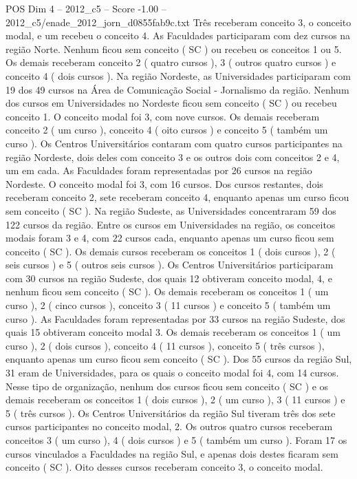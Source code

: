 \begin{textsample}{POS Dim 4 – 2012\_c5 – Score -1.00 – 2012\_c5/enade\_2012\_jorn\_d0855fab9c.txt}
Três receberam conceito 3, o conceito modal, e um recebeu o conceito 4.
As Faculdades participaram com dez cursos na região Norte.
Nenhum ficou sem conceito ( SC ) ou recebeu os conceitos 1 ou 5.
Os demais receberam conceito 2 ( quatro cursos ), 3 ( outros quatro cursos ) e conceito 4 ( dois cursos ).
Na região Nordeste, as Universidades participaram com 19 dos 49 cursos na Área de Comunicação Social - Jornalismo da região.
Nenhum dos cursos em Universidades no Nordeste ficou sem conceito ( SC ) ou recebeu conceito 1.
O conceito modal foi 3, com nove cursos.
Os demais receberam conceito 2 ( um curso ), conceito 4 ( oito cursos ) e conceito 5 ( também um curso ).
Os Centros Universitários contaram com quatro cursos participantes na região Nordeste, dois deles com conceito 3 e os outros dois com conceitos 2 e 4, um em cada.
As Faculdades foram representadas por 26 cursos na região Nordeste.
O conceito modal foi 3, com 16 cursos.
Dos cursos restantes, dois receberam conceito 2, sete receberam conceito 4, enquanto apenas um curso ficou sem conceito ( SC ).
Na região Sudeste, as Universidades concentraram 59 dos 122 cursos da região.
Entre os cursos em Universidades na região, os conceitos modais foram 3 e 4, com 22 cursos cada, enquanto apenas um curso ficou sem conceito ( SC ).
Os demais cursos receberam os conceitos 1 ( dois cursos ), 2 ( seis cursos ) e 5 ( outros seis cursos ).
Os Centros Universitários participaram com 30 cursos na região Sudeste, dos quais 12 obtiveram conceito modal, 4, e nenhum ficou sem conceito ( SC ).
Os demais receberam os conceitos 1 ( um curso ), 2 ( cinco cursos ), conceito 3 ( 11 cursos ) e conceito 5 ( também um curso ).
As Faculdades foram representadas por 33 cursos na região Sudeste, dos quais 15 obtiveram conceito modal 3.
Os demais receberam os conceitos 1 ( um curso ), 2 ( dois cursos ), conceito 4 ( 11 cursos ), conceito 5 ( três cursos ), enquanto apenas um curso ficou sem conceito ( SC ).
Dos 55 cursos da região Sul, 31 eram de Universidades, para os quais o conceito modal foi 4, com 14 cursos.
Nesse tipo de organização, nenhum dos cursos ficou sem conceito ( SC ) e os demais receberam os conceitos 1 ( dois cursos ), 2 ( um curso ), 3 ( 11 cursos ) e 5 ( três cursos ).
Os Centros Universitários da região Sul tiveram três dos sete cursos participantes no conceito modal, 2.
Os outros quatro cursos receberam conceitos 3 ( um curso ), 4 ( dois cursos ) e 5 ( também um curso ).
Foram 17 os cursos vinculados a Faculdades na região Sul, e apenas dois destes ficaram sem conceito ( SC ).
Oito desses cursos receberam conceito 3, o conceito modal.

\end{textsample}
